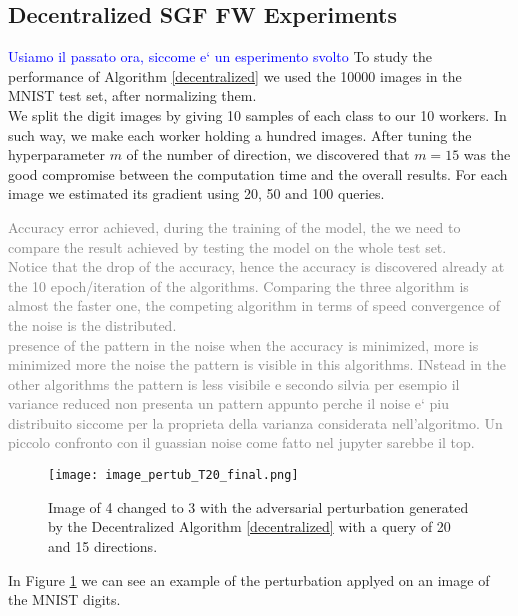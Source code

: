 \subsection{Decentralized SGF FW Experiments}
\textcolor{blue}{Usiamo il passato ora, siccome e` un esperimento svolto}
To study the performance of Algorithm \ref{decentralized} we used the 10000 images in the MNIST test set, after normalizing them.\\ We split the digit images by giving 10 samples of each class to our 10 workers. In such way, we make each worker holding a hundred images. After tuning the hyperparameter $m$ of the number of direction, we discovered that $m=15$ was the good compromise between the computation time and the overall results. For each image we estimated its gradient using 20, 50 and 100 queries.

\textcolor{gray}{Accuracy error achieved, during the training of the model, the we need to compare the result achieved by testing the model on the whole test set.\\ Notice that the drop of the accuracy, hence the accuracy is discovered already at the 10 epoch/iteration of the algorithms. Comparing the three algorithm is almost the faster one, the competing algorithm in terms of speed convergence of the noise is the distributed.
\\ presence of the pattern in the noise when the accuracy is minimized, more is minimized more the noise the pattern is visible in this algorithms. INstead in the other algorithms the pattern is less visibile e secondo silvia per esempio il variance reduced non presenta un pattern appunto perche il noise e` piu distribuito siccome per la proprieta della varianza considerata nell'algoritmo.
Un piccolo confronto con il guassian noise come fatto nel jupyter sarebbe il top.
}
\begin{figure}[htbp]
	\centering
	\texttt{[image: image\_pertub\_T20\_final.png]}
	\caption{Image of 4 changed to 3 with the adversarial perturbation generated by the Decentralized Algorithm \ref{decentralized} with a query of 20 and 15 directions.}
	\label{fig:decentralized}
\end{figure}
In Figure \ref{fig:decentralized} we can see an example of the perturbation applyed on an image of the MNIST digits.
